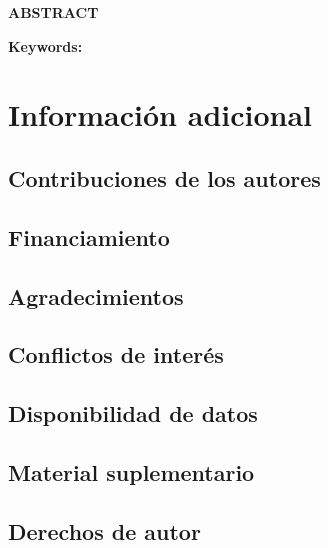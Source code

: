 {  %
  \begin{mdframed}[linewidth=0.5pt, backgroundcolor=gray!5]
    \begin{center}
      \textbf{ABSTRACT}
    \end{center}
    \articleabstracten
    \vspace{1em}
    \noindent\textbf{Keywords:} \articlekeywordsen
  \end{mdframed}
  \vspace{1em}
}{%
  \clearpage
  \section*{Información adicional}

  \subsection*{Contribuciones de los autores}
  \authorcontributions

  \subsection*{Financiamiento}
  \funding

  \subsection*{Agradecimientos}
  \acknowledgments

  \subsection*{Conflictos de interés}
  \conflictsofinterest

  \subsection*{Disponibilidad de datos}
  \dataavailability

  \subsection*{Material suplementario}
  \supplementarymaterials

  \subsection*{Derechos de autor}
  \copyrightinfo

  \printbibliography[heading=bibintoc, title=Referencias]

  \clearpage
}

